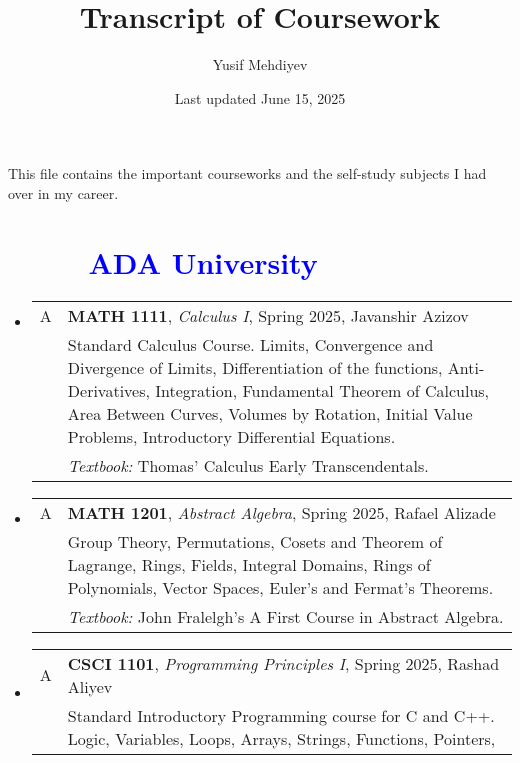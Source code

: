 \documentclass[12pt]{article}
\title{Transcript of Coursework}
\author{Yusif Mehdiyev}
\date{Last updated June 15, 2025}
\begin{document}
\maketitle

This file contains the important courseworks and the self-study subjects  I had over in my career.
\renewcommand{\contentsname}{Contents:} %
\tableofcontents

\section*{\textcolor{blue}{\ \ \ \ \  ADA University}}
\begin{itemize}[leftmargin = *]
    \item[]
        \begin{tabularx}{\textwidth}{@{}lX@{}}
            A & \textbf{MATH 1111}, \textit{Calculus I}, Spring 2025, Javanshir Azizov
            \\
            & Standard Calculus Course. Limits, Convergence and Divergence of Limits, Differentiation of the functions, Anti-Derivatives,
            Integration, Fundamental Theorem of Calculus, Area Between Curves, Volumes by Rotation, Initial Value Problems, Introductory
            Differential Equations.
            \\
            & \textit{Textbook:} Thomas’ Calculus Early Transcendentals.
        \end{tabularx}
    \item[]
        \begin{tabularx}{\textwidth}{@{}lX@{}}
            A & \textbf{MATH 1201}, \textit{Abstract Algebra}, Spring 2025, Rafael Alizade
            \\
            & Group Theory, Permutations, Cosets and Theorem of Lagrange, Rings, Fields, Integral Domains, Rings of Polynomials, Vector
            Spaces, Euler's and Fermat's Theorems.
            \\
            & \textit{Textbook:} John Fralelgh's A First Course in Abstract Algebra.
        \end{tabularx}
    \item[]
        \begin{tabularx}{\textwidth}{@{}lX@{}}
            A & \textbf{CSCI 1101}, \textit{Programming Principles I}, Spring 2025, Rashad Aliyev
            \\
            & Standard Introductory Programming course for C and C++. Logic, Variables, Loops, Arrays, Strings, Functions, Pointers,

\end{tabularx}
\end{itemize}
\end{document}
